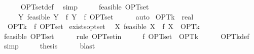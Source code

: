 \begin{isabellebody}
\ \ \ \ \isamarkupfalse%
\ OPT{\isacharunderscore}{\kern0pt}set{\isacharunderscore}{\kern0pt}def\ \isamarkupfalse%
\ simp\isanewline
\ \ \isamarkupfalse%
\ \isamarkupfalse%
\ {\isachardoublequoteopen}feasible\ OPT{\isacharunderscore}{\kern0pt}set{\isachardoublequoteclose}\isanewline
\ \ \ \ \ {\isachardoublequoteopen}{\isasymforall}Y{\isachardot}{\kern0pt}\ feasible\ Y\ {\isasymlongrightarrow}\ f\ Y\ {\isasymle}\ f\ OPT{\isacharunderscore}{\kern0pt}set{\isachardoublequoteclose}\isanewline
\ \ \ \ \isamarkupfalse%
\ auto\isanewline
{}\isamarkupfalse%
%
\endisatagproof
{\isafoldproof}%
%
\isadelimproof
\isanewline
%
\endisadelimproof
\isanewline
{}\isamarkupfalse%
\ OPT{\isacharunderscore}{\kern0pt}k\ {\isacharcolon}{\kern0pt}{\isacharcolon}{\kern0pt}\ real\ \isanewline
\ \ {\isachardoublequoteopen}OPT{\isacharunderscore}{\kern0pt}k\ {\isacharequal}{\kern0pt}\ f\ OPT{\isacharunderscore}{\kern0pt}set{\isachardoublequoteclose}\isanewline
\isanewline
{}\isamarkupfalse%
\ exists{\isacharunderscore}{\kern0pt}opt{\isacharunderscore}{\kern0pt}set{\isacharcolon}{\kern0pt}\isanewline
\ \ {\isachardoublequoteopen}{\isasymexists}X{\isachardot}{\kern0pt}\ feasible\ X\ {\isasymand}\ f\ X\ {\isacharequal}{\kern0pt}\ OPT{\isacharunderscore}{\kern0pt}k{\isachardoublequoteclose}\isanewline
%
\isadelimproof
%
\endisadelimproof
%
\isatagproof
{}\isamarkupfalse%
\ {\isacharminus}{\kern0pt}\isanewline
\ \ \isamarkupfalse%
\ {\isachardoublequoteopen}feasible\ OPT{\isacharunderscore}{\kern0pt}set{\isachardoublequoteclose}\isanewline
\ \ \ \ \isamarkupfalse%
\ {\isacharparenleft}{\kern0pt}rule\ OPT{\isacharunderscore}{\kern0pt}set{\isacharunderscore}{\kern0pt}in{\isacharparenright}{\kern0pt}\isanewline
\ \ \isamarkupfalse%
\ \isamarkupfalse%
\ {\isachardoublequoteopen}f\ OPT{\isacharunderscore}{\kern0pt}set\ {\isacharequal}{\kern0pt}\ OPT{\isacharunderscore}{\kern0pt}k{\isachardoublequoteclose}\isanewline
\ \ \ \ \isamarkupfalse%
\ OPT{\isacharunderscore}{\kern0pt}k{\isacharunderscore}{\kern0pt}def\ \isamarkupfalse%
\ simp\isanewline
\ \ \isamarkupfalse%
\ \isamarkupfalse%
\ {\isacharquery}{\kern0pt}thesis\isanewline
\ \ \ \ \isamarkupfalse%
\ blast\isanewline
{}\isamarkupfalse%

\end{isabellebody}
